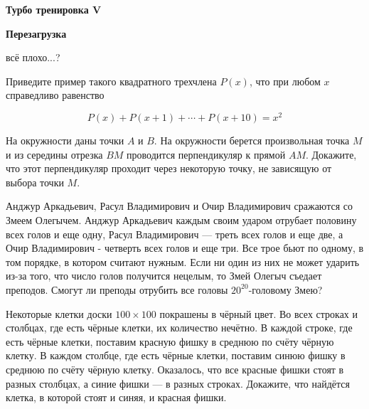 \centerline{\bf \Huge Турбо тренировка V}
\centerline{\bf \Huge Перезагрузка}

\begin{flushright}
        \scriptsize{всё плохо...?}
\end{flushright}

Приведите пример такого квадратного трехчлена $P(x)$, что при любом $x$ справедливо равенство

$$
P(x)+P(x+1)+\cdots+P(x+10)=x^2
$$


На окружности даны точки $A$   и $B$.   На окружности берется произвольная точка $M$   и из середины отрезка $BM$   проводится перпендикуляр к прямой $AM$.   Докажите, что этот перпендикуляр проходит через некоторую точку, не зависящую от выбора точки $M.$

Анджур Аркадьевич, Расул Владимирович и Очир Владимирович сражаются со Змеем Олегычем. Анджур Аркадьевич каждым своим ударом отрубает половину всех голов и еще одну, Расул Владимирович --- треть всех голов и еще две, а Очир Владимирович - четверть всех голов и еще три. Все трое бьют по одному, в том порядке, в котором считают нужным. Если ни один из них не может ударить из-за того, что число голов получится нецелым, то Змей Олегыч съедает преподов. Смогут ли преподы отрубить все головы $20^{20}$-головому Змею?

Некоторые клетки доски $100\times100$ покрашены в чёрный цвет. Во всех строках и столбцах, где есть чёрные клетки, их количество нечётно. В каждой строке, где есть чёрные клетки, поставим красную фишку в среднюю по счёту чёрную клетку. В каждом столбце, где есть чёрные клетки, поставим синюю фишку в среднюю по счёту чёрную клетку. Оказалось, что все красные фишки стоят в разных столбцах, а синие фишки — в разных строках. Докажите, что найдётся клетка, в которой стоят и синяя, и красная фишки.
